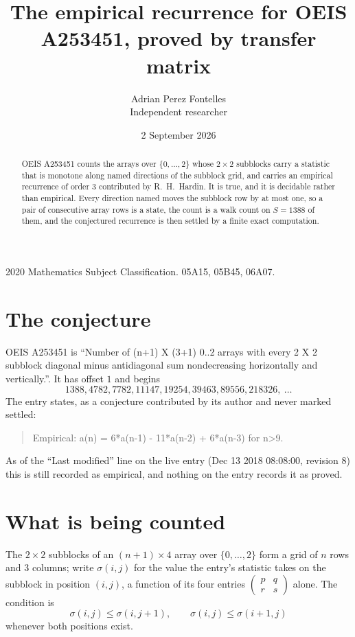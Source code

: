 \documentclass[11pt,a4paper]{article}
\title{The empirical recurrence for OEIS A253451, proved by transfer matrix}
\author{Adrian Perez Fontelles\\ \small Independent researcher}
\date{2 September 2026}
\theoremstyle{plain}
\theoremstyle{definition}
\begin{document}
\maketitle

\begin{abstract}
OEIS A253451 counts the arrays over $\{0,\dots,2\}$ whose $2\times2$ subblocks carry a
statistic that is monotone along named directions of the subblock grid, and carries an
empirical recurrence of order $3$ contributed by R.~H.~Hardin. It is true, and it is
decidable rather than empirical. Every direction named moves the subblock row by at most one,
so a pair of consecutive array rows is a state, the count is a walk count on $S=1388$ of them,
and the conjectured recurrence is then settled by a finite exact computation.
\end{abstract}

\noindent\small 2020 Mathematics Subject Classification. 05A15, 05B45, 06A07.\normalsize

\section{The conjecture}

OEIS A253451 is ``Number of (n+1) X (3+1) 0..2 arrays with every 2 X 2 subblock diagonal minus antidiagonal sum nondecreasing horizontally and vertically.''. It has offset $1$ and begins
\[
1388, 4782, 7782, 11147, 19254, 39463, 89556, 218326,\ \dots
\]
The entry states, as a conjecture contributed by its author and never marked settled:
\begin{quote}
Empirical: a(n) = 6*a(n-1) - 11*a(n-2) + 6*a(n-3) for n>9.
\end{quote}
As of the ``Last modified'' line on the live entry (Dec 13 2018 08:08:00, revision 8) this is still
recorded as empirical, and nothing on the entry records it as proved.

\section{What is being counted}

The $2\times2$ subblocks of an $(n+1)\times4$ array over $\{0,\dots,2\}$ form a grid
of $n$ rows and $3$ columns; write $\sigma(i,j)$ for the value the entry's statistic takes on
the subblock in position $(i,j)$, a function of its four entries
$\begin{pmatrix}p&q\\r&s\end{pmatrix}$ alone. The condition is
\[
\sigma(i,j)\le\sigma(i,j+1),\qquad \sigma(i,j)\le\sigma(i+1,j)
\]
whenever both positions exist.
\end{document}

